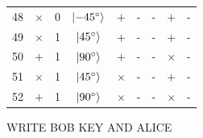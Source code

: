\begin{longtable}{c|ccc|ccc|cc}
  48                                      & $\times$ & 0 &
  $\ket{\SI{-45}{\degree}}$ & $+$      & - & -
  & $+$      & - \\
  49                                      & $\times$ & 1 &
  $\ket{\SI{45}{\degree}}$  & $+$      & - & -
  & $+$      & - \\
  50                                      & $+$      & 1 &
  $\ket{\SI{90}{\degree}}$  & $+$      & - & -
  & $\times$ & - \\
  51                                      & $\times$ & 1 &
  $\ket{\SI{45}{\degree}}$  & $\times$ & - & -
  & $+$      & - \\
  52                                      & $+$      & 1 &
  $\ket{\SI{90}{\degree}}$  & $\times$ & - & -
  & $\times$ & -
\end{longtable}

WRITE BOB KEY AND ALICE